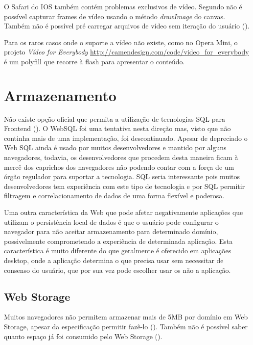 O Safari do IOS também contém problemas exclusivos de vídeo. Segundo
\citet{unsolvedMediaHtmlIssues} não é possível capturar frames de
vídeo usando o método \textit{drawImage} do canvas. Também não é
possível pré carregar arquivos de vídeo sem iteração do usuário
().

Para os raros casos onde o suporte a vídeo não existe,
como no Opera Mini, o projeto \textit{Vídeo for Everybody}
\url{http://camendesign.com/code/video_for_everybody} é um polyfill que
recorre à flash para apresentar o conteúdo.

\section{Armazenamento}

Não existe opção oficial que permita a utilização de tecnologias
SQL para Frontend (). O WebSQL foi uma
tentativa nesta direção mas, visto que não continha mais de uma
implementação, foi descontinuado. Apesar de depreciado o Web SQL ainda
é usado por muitos desenvolvedores e mantido por alguns navegadores,
todavia, os desenvolvedores que procedem desta maneira ficam à mercê
dos caprichos dos navegadores não podendo contar com a força de um
órgão regulador para suportar a tecnologia. SQL seria interessante pois
muitos desenvolvedores tem experiência com este tipo de tecnologia e
por SQL permitir filtragem e correlacionamento de dados de uma forma
flexível e poderosa.

Uma outra característica da Web que pode afetar negativamente
aplicações que utilizam o persistência local de dados é que o
usuário pode configurar o navegador para não aceitar armazenamento
para determinado domínio, possivelmente comprometendo a experiência
de determinada aplicação. Esta característica é muito diferente do
que geralmente é oferecido em aplicações desktop, onde a aplicação
determina o que precisa usar sem necessitar de consenso do usuário, que
por sua vez pode escolher usar os não a aplicação.

\subsection{Web Storage}

Muitos navegadores não permitem armazenar mais de 5MB por domínio
em Web Storage, apesar da especificação permitir fazê-lo
\autocite{gameAssetManagement} (). Também
não é possível saber quanto espaço já foi consumido pelo Web
Storage ().


